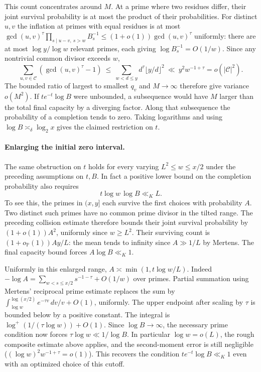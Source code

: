 \documentclass[11pt]{article}
\begin{document}
This count concentrates around $M$. At a prime where two residues
differ, their joint survival probability is at most the product of
their probabilities. For distinct $u,v$ the inflation at primes with
equal residues is at most
$\gcd(u,v)^\tau\prod_{s\mid u-v,\ s>w} B_s^{-1}
\le(1+o(1))\gcd(u,v)^\tau$ uniformly: there are at most
$\log y/\log w$ relevant primes, each giving $\log B_s^{-1}=O(1/w)$.
Since any nontrivial common divisor exceeds $w$,
\[
 \sum_{u,v\in\mathcal C}(\gcd(u,v)^\tau-1)
 \ \le\ \sum_{w<d\le y}d^\tau\lfloor y/d\rfloor^2
 \ \ll\ y^2w^{-1+\tau}=o(|\mathcal C|^2).
\]
The bounded ratio of largest to smallest $q_v$ and $M\to\infty$
therefore give variance $o(M^2)$. If $t e^{-t}\log B$ were unbounded,
a subsequence would have $M$ larger than the total final capacity by
a diverging factor. Along that subsequence the probability of a
completion tends to zero. Taking logarithms and using
$\log B\asymp_\delta\log_2 x$ gives the claimed restriction on $t$.

\paragraph{Enlarging the initial zero interval.}
The same obstruction on $t$ holds for every varying
$L^2\le w\le x/2$ under the preceding assumptions on $t,B$.
In fact a positive lower bound on the completion probability also
requires
\[
                 t\log w\,\log B\ll_K L .
\]
To see this, the primes in $(x,y]$ each survive the first choices
with probability $A$. Two distinct such primes have no common
prime divisor in the tilted range. The preceding collision estimate
therefore bounds their joint survival probability by
$(1+o(1))A^2$, uniformly since $w\ge L^2$. Their surviving count
is $(1+o_{\mathbb P}(1))Ay/L$: the mean tends to infinity since
$A\gg 1/L$ by Mertens. The final capacity bound forces
$A\log B\ll_K1$.

Uniformly in this enlarged range,
$A\asymp\min(1,t\log w/L)$. Indeed
$-\log A=\sum_{w<s\le x/2}s^{-1-\tau}+O(1/w)$ over primes.
Partial summation using Mertens' reciprocal prime estimate replaces
the sum by $\int_{\log w}^{\log(x/2)}e^{-\tau v}\,dv/v+O(1)$,
uniformly. The upper endpoint after scaling by $\tau$ is bounded
below by a positive constant. The integral is
$\log^+(1/(\tau\log w))+O(1)$. Since $\log B\to\infty$, the
necessary prime condition now forces $\tau\log w\ll1/\log B$.
In particular $\log w=o(L)$, the rough composite estimate above
applies, and the second-moment error is still negligible
($(\log w)^2w^{-1+\tau}=o(1)$). This recovers the condition
$te^{-t}\log B\ll_K1$ even with an optimized choice of this cutoff.
\end{document}
